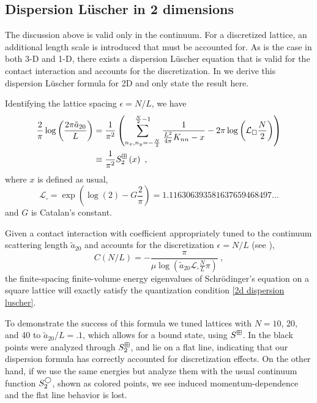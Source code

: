 \subsection{Dispersion L\"uscher in 2 dimensions}

The discussion above is valid only in the continuum.
For a discretized lattice, an additional length scale is introduced that must be accounted for.
As is the case in both 3-D and 1-D, there exists a dispersion L\"uscher equation that is valid for the contact interaction and accounts for the discretization.
In  we derive this dispersion L\"uscher formula for 2D and only state the result here.

Identifying the lattice spacing $\epsilon=N/L$, we have
\begin{align}
    \frac{2}{\pi} \log \left(\frac{2\pi \tilde a_{20}}{L}\right)
    &=
    \frac{1}{\pi^2}
    \left(
        \sum_{n_x,n_y=-\frac{N}{2}}^{\frac{N}{2}-1}\frac{1}{\frac{L^2}{4\pi}K_{nn}-x}
        -2\pi \log \left(\mathcal{L}_\square\frac{N}{2}\right)
    \right)
    \nonumber\\
    &\equiv\frac{1}{\pi^2}S^{\dispersion}_2\left(x\right)\ ,\label{eq:2d dispersion luscher}
\end{align}
where $x$ is defined as usual,
\begin{equation}
    \mathcal{L}_{\square}
    =
    \exp \left(\log (2)-G \frac{2}{\pi}\right)
    =
    1.116306393581637659468497 \ldots
\end{equation}
and $G$ is Catalan's constant.

Given a contact interaction with coefficient appropriately tuned to the continuum scattering length $\tilde a_{20}$ and accounts for the discretization $\epsilon=N/L$ (see ),
\begin{equation}
C(N/L)=-\frac{ \pi}{\mu \log \left(\tilde a_{20} \mathcal{L}_\square \frac{N}{L}\pi\right)}\ ,
\end{equation}
the finite-spacing finite-volume energy eigenvalues of Schr\"odinger's equation on a square lattice will exactly satisfy the quantization condition \eqref{2d dispersion luscher}.

To demonstrate the success of this formula we tuned lattices with $N=10$, 20, and 40 to $\tilde a_{20}/L = .1$, which allows for a bound state, using $S^{\boxplus}$.
In  the black points were analyzed through $S^\boxplus_2$, and lie on a flat line, indicating that our dispersion \Luscher formula has correctly accounted for discretization effects.
On the other hand, if we use the same energies but analyze them with the usual continuum \Luscher function $S^{\bigcirc}_2$, shown as colored points, we see induced momentum-dependence and the flat line behavior is lost.

